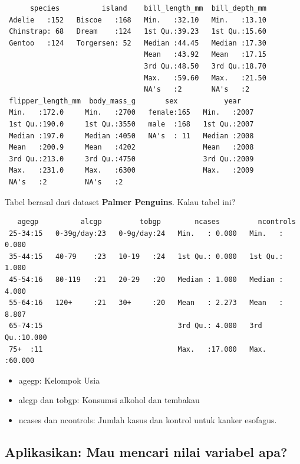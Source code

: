 \documentclass[
  letterpaper,
  DIV=11,
  numbers=noendperiod]{scrreprt}
\providecommand{\tightlist}{%
  \setlength{\itemsep}{0pt}\setlength{\parskip}{0pt}}\usepackage{longtable,booktabs,array}
\begin{document}
\begin{verbatim}
      species          island    bill_length_mm  bill_depth_mm  
 Adelie   :152   Biscoe   :168   Min.   :32.10   Min.   :13.10  
 Chinstrap: 68   Dream    :124   1st Qu.:39.23   1st Qu.:15.60  
 Gentoo   :124   Torgersen: 52   Median :44.45   Median :17.30  
                                 Mean   :43.92   Mean   :17.15  
                                 3rd Qu.:48.50   3rd Qu.:18.70  
                                 Max.   :59.60   Max.   :21.50  
                                 NA's   :2       NA's   :2      
 flipper_length_mm  body_mass_g       sex           year     
 Min.   :172.0     Min.   :2700   female:165   Min.   :2007  
 1st Qu.:190.0     1st Qu.:3550   male  :168   1st Qu.:2007  
 Median :197.0     Median :4050   NA's  : 11   Median :2008  
 Mean   :200.9     Mean   :4202                Mean   :2008  
 3rd Qu.:213.0     3rd Qu.:4750                3rd Qu.:2009  
 Max.   :231.0     Max.   :6300                Max.   :2009  
 NA's   :2         NA's   :2                                 
\end{verbatim}

Tabel berasal dari dataset \textbf{Palmer Penguins}. Kalau tabel ini?

\begin{verbatim}
   agegp          alcgp         tobgp        ncases         ncontrols     
 25-34:15   0-39g/day:23   0-9g/day:24   Min.   : 0.000   Min.   : 0.000  
 35-44:15   40-79    :23   10-19   :24   1st Qu.: 0.000   1st Qu.: 1.000  
 45-54:16   80-119   :21   20-29   :20   Median : 1.000   Median : 4.000  
 55-64:16   120+     :21   30+     :20   Mean   : 2.273   Mean   : 8.807  
 65-74:15                                3rd Qu.: 4.000   3rd Qu.:10.000  
 75+  :11                                Max.   :17.000   Max.   :60.000  
\end{verbatim}

\begin{itemize}
\tightlist
\item
  agegp: Kelompok Usia
\item
  alcgp dan tobgp: Konsumsi alkohol dan tembakau
\item
  ncases dan ncontrols: Jumlah kasus dan kontrol untuk kanker esofagus.
\end{itemize}

\hypertarget{aplikasikan-mau-mencari-nilai-variabel-apa}{%
\subsection{Aplikasikan: Mau mencari nilai variabel
apa?}\label{aplikasikan-mau-mencari-nilai-variabel-apa}}
\end{document}
